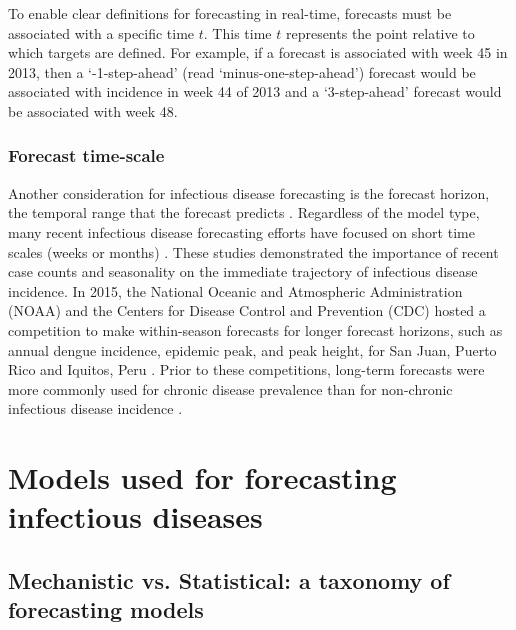 \documentclass[a4paper]{article}
\begin{document}
To enable clear definitions for forecasting in real-time, forecasts must be associated with a specific time $t$.
This time $t$ represents the point relative to which targets are defined.
For example, if a forecast is associated with week 45 in 2013, then a `-1-step-ahead' (read `minus-one-step-ahead') forecast would be associated with incidence in week 44 of 2013 and a `3-step-ahead' forecast would be associated with week 48.

\subsubsection*{Forecast time-scale}

Another consideration for infectious disease forecasting is the forecast horizon, the temporal range that the forecast predicts \cite{Myers2000, Soyiri2013}.
Regardless of the model type, many recent infectious disease forecasting efforts have focused on short time scales (weeks or months) \cite{Birrell2011, Buczak2012, Gerardi2011, Hii2012, Lowe2011, Lu2010, Nishiura2011, Reich2016a, Shaman2013, Shaman2014, Sumi2012, Yan2010}.
These studies demonstrated the importance of recent case counts and seasonality on the immediate trajectory of infectious disease incidence.
In 2015, the National Oceanic and Atmospheric Administration (NOAA) and the Centers for Disease Control and Prevention (CDC) hosted a competition to make within-season forecasts for longer forecast horizons, such as annual dengue incidence, epidemic peak, and peak height, for San Juan, Puerto Rico and Iquitos, Peru \cite{NOAA2015}.
Prior to these competitions, long-term forecasts were more commonly used for chronic disease prevalence than for non-chronic infectious disease incidence \cite{Soyiri2013}.

\section{Models used for forecasting infectious diseases}

\subsection{Mechanistic vs. Statistical: a taxonomy of forecasting models}
\end{document}
